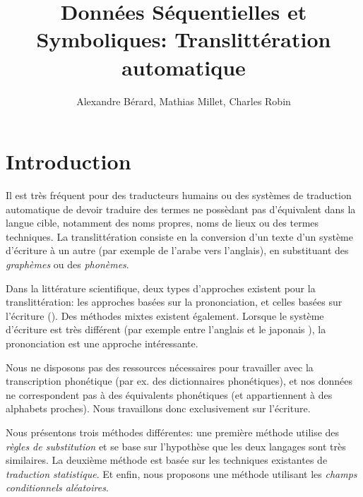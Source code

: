 \documentclass{article}
\begin{document}
\title{Données Séquentielles et Symboliques: Translittération automatique}

\author{Alexandre Bérard, Mathias Millet, Charles Robin}
\maketitle
\section{Introduction}

Il est très fréquent pour des traducteurs humains ou des systèmes de traduction automatique de devoir traduire des termes ne possèdant pas d'équivalent dans la langue cible, notamment des noms propres, noms de lieux ou des termes techniques.
La translittération consiste en la conversion d'un texte d'un système d'écriture à un autre (par exemple de l'arabe vers l'anglais), en substituant des \emph{graphèmes} ou des \emph{phonèmes}.

Dans la littérature scientifique, deux types d'approches existent pour la translittération: les approches basées sur la prononciation, et celles basées sur l'écriture (\cite{OhChoi06}). Des méthodes mixtes existent également. Lorsque le système d'écriture est très différent (par exemple entre l'anglais et le japonais \cite{Knight98}), la prononciation est une approche intéressante.

Nous ne disposons pas des ressources nécessaires pour travailler avec la transcription phonétique (par ex. des dictionnaires phonétiques), et nos données ne correspondent pas à des équivalents phonétiques (et appartiennent à des alphabets proches). Nous travaillons donc exclusivement sur l'écriture.

Nous présentons trois méthodes différentes: une première méthode utilise des \emph{règles de substitution} et se base sur l'hypothèse que les deux langages sont très similaires. La deuxième méthode est basée sur les techniques existantes de \emph{traduction statistique}. Et enfin, nous proposons une méthode utilisant les \emph{champs conditionnels aléatoires}.
\end{document}

